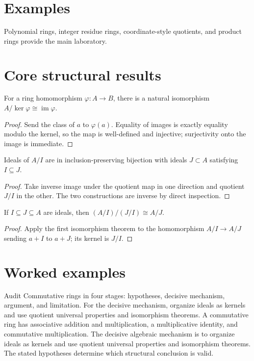 \section{Examples}
Polynomial rings, integer residue rings, coordinate-style quotients, and product rings provide the main laboratory.

\section{Core structural results}

\begin{theorem}\label{thm:v01-01}
For a ring homomorphism $\varphi:A\to B$, there is a natural isomorphism $A/\ker\varphi\cong\operatorname{im}\varphi$.
\begin{proof}
Send the class of $a$ to $\varphi(a)$. Equality of images is exactly equality modulo the kernel, so the map is well-defined and injective; surjectivity onto the image is immediate.
\end{proof}
\end{theorem}

\begin{theorem}\label{thm:v01-02}
Ideals of $A/I$ are in inclusion-preserving bijection with ideals $J\subset A$ satisfying $I\subseteq J$.
\begin{proof}
Take inverse image under the quotient map in one direction and quotient $J/I$ in the other. The two constructions are inverse by direct inspection.
\end{proof}
\end{theorem}

\begin{theorem}\label{thm:v01-03}
If $I\subseteq J\subseteq A$ are ideals, then $(A/I)/(J/I)\cong A/J$.
\begin{proof}
Apply the first isomorphism theorem to the homomorphism $A/I\to A/J$ sending $a+I$ to $a+J$; its kernel is $J/I$.
\end{proof}
\end{theorem}

\section{Worked examples}

\begin{example}\label{ex:v01-worked-01}
Audit Commutative rings in four stages: hypotheses, decisive mechanism, argument, and limitation. For the decisive mechanism, organize ideals as kernels and use quotient universal properties and isomorphism theorems. A commutative ring has associative addition and multiplication, a multiplicative identity, and commutative multiplication. The decisive algebraic mechanism is to organize ideals as kernels and use quotient universal properties and isomorphism theorems. The stated hypotheses determine which structural conclusion is valid.
\end{example}

